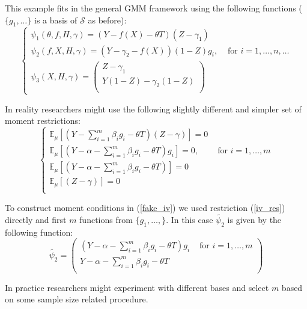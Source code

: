 \documentclass[12pt]{article}
\theoremstyle{plain}
\begin{document}
This example fits in the general GMM framework using the following functions ($\{g_1,\dots\}$ is a basis of $\mathcal{S}$ as before):
\begin{equation}
\begin{cases}\label{true_iv}
\psi_1(\theta,f,H,\gamma) = (Y-f(X)-\theta T)(Z-\gamma_1)&\\
\psi_2(f,X,H,\gamma) = (Y-\gamma_2-f(X))(1-Z)g_i, &\text{ for $i = 1,\dots, n,\dots$}\\
\psi_3(X,H,\gamma) = \begin{pmatrix} Z-\gamma_1\\ Y(1-Z)-\gamma_2 (1-Z)\\\end{pmatrix}&
\end{cases}
\end{equation}

In reality researchers might use the following slightly different and simpler set of moment restrictions:
\begin{equation}
\begin{cases}\label{fake_iv}
\mathbb{E}_{\mu}\left[(Y-\sum_{i=1}^m\beta_i g_i-\theta T)(Z-\gamma)\right]=0&\\
\mathbb{E}_{\mu}\left[(Y-\alpha-\sum_{i=1}^m\beta_i g_i-\theta T)g_i\right] = 0, &\text{ for $i = 1,\dots, m$}\\
\mathbb{E}_{\mu}\left[(Y-\alpha-\sum_{i=1}^m\beta_i g_i-\theta T)\right] = 0\\
\mathbb{E}_{\mu}\left[(Z-\gamma)\right]=0 &\\
\end{cases}
\end{equation}

To construct moment conditions in (\ref{fake_iv}) we used restriction (\ref{iv_res}) directly and first $m$ functions from $\{g_1,\dots, \}$. In this case $\tilde{\psi_2}$ is given by the following function:
\begin{equation}\label{psi_iv}
\tilde{\psi_2} = \begin{pmatrix}
(Y-\alpha-\sum_{i=1}^m\beta_i g_i-\theta T)g_i  &\text{ for $i = 1,\dots, m$}\\
Y-\alpha-\sum_{i=1}^m\beta_i g_i-\theta T\\
\end{pmatrix}
\end{equation}

In practice researchers might experiment with different bases and select $m$ based on some sample size related procedure. 
\end{document}

